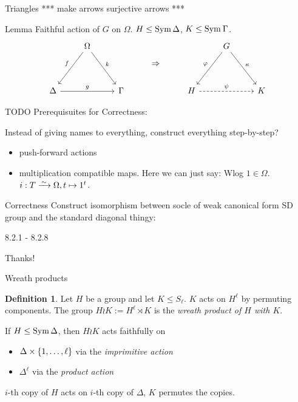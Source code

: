 \documentclass{beamer}
\theoremstyle{plain}
\theoremstyle{definition}
\newtheorem{defn}[thm]{Definition}
\newcommand{\todo}[1]{{\color{red}*** #1 ***}}
\begin{document}
\begin{frame}{Triangles}
\todo{make arrows surjective arrows}
\begin{block}{Lemma}
Faithful action of $G$ on $\Omega$.
$H \leq \operatorname{Sym} \Delta$, $K \leq \sym \Gamma$.
\[
\begin{tikzcd}[ampersand replacement=\&]
    \&
    \Omega
        \ar[ld, "f"']
        \ar[rd, "k"]
    \&
    \&
    \raisebox{-2em}{$\Rightarrow$}
    \&
    \&
    G
        \ar[ld, "\phi"']
        \ar[rd, "\kappa"]
    \&
    \\
    \Delta
        \ar[rr, "g"]
    \&
    \&
    \Gamma
    \&
    \&
    H
        \ar[rr, dashrightarrow, "\psi"]
    \&
    \&
    K
\end{tikzcd}
\]
\end{block}
\end{frame}

\begin{frame}{TODO}
Prerequisuites for Correctness:

Instead of giving names to everything, construct everything step-by-step?
\begin{itemize}
\item push-forward actions
\item multiplication compatible maps. Here we can just say:
Wlog $1 \in \Omega$.
$i : T \iso \Omega, t \mapsto 1 ^ t$.
\end{itemize}
\end{frame}

\begin{frame}{Correctness}
Construct isomorphism between socle of weak canonical form SD group and the
standard diagonal thingy:

8.2.1 - 8.2.8
\end{frame}

\begin{frame}[standout]
Thanks!
\end{frame}

\printbibliography
\appendix


\begin{frame}{Wreath products}
\begin{defn}
    Let $H$ be a group and let $K \leq S_\ell$.
    $K$ acts on $H ^ \ell$ by permuting components.
    The group
    $H \wr K := H ^ \ell \rtimes K$
    is the \emph{wreath product of $H$ with $K$}.
\end{defn}

\pause
If $H \leq \operatorname{Sym} \Delta$, then $H \wr K$ acts faithfully on
\begin{itemize}
\item $\Delta \times  \left\{ 1, \ldots, \ell \right\} $ via the \emph{imprimitive action}
\item $\Delta ^ \ell$ via the \emph{product action}
\end{itemize}

$i$-th copy of $H$ acts on $i$-th copy of $\Delta$, $K$ permutes the copies.
\end{frame}

\end{document}
